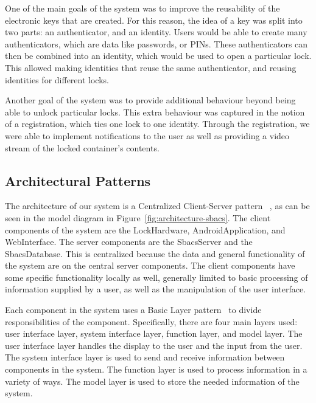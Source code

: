 \documentclass[12pt]{report}
\let\Oldsubsection\subsection
\renewcommand{\subsection}{\FloatBarrier\Oldsubsection}
\begin{document}
One of the main goals of the system was to improve the reusability of the electronic keys that are created. For this
reason, the idea of a key was split into two parts: an authenticator, and an identity. Users would be able to create
many authenticators, which are data like passwords, or PINs. These authenticators can then be combined into an identity, which
would be used to open a particular lock. This allowed making identities that reuse the same authenticator, and reusing
identities for different locks.

Another goal of the system was to provide additional behaviour beyond being able to unlock particular locks.
This extra behaviour was captured in the notion of a registration, which ties one lock to one identity. Through the
registration, we were able to implement notifications to the user as well as providing a video stream of the locked 
container's contents.


\subsection{Architectural Patterns} \label{architectural-patterns}

The architecture of our system is a Centralized Client-Server pattern ~\autocite{CLIENTSERVERARCH}, as can be seen 
in the model diagram in Figure~\ref{fig:architecture-sbacs}. The client components of
the system are the LockHardware, AndroidApplication, and WebInterface. The server components are the SbacsServer and
the SbacsDatabase. This is centralized because the data and general functionality of the system are on the central
server components. The client components have some specific functionality locally as well, generally limited to
basic processing of information supplied by a user, as well as the manipulation of the user interface.

Each component in the system uses a Basic Layer pattern~\autocite{LAYERPATTERNBOOK} to divide responsibilities of the component. Specifically,
there are four main layers used: user interface layer, system interface layer, function layer, and model layer.
The user interface layer handles the display to the user and the input from the user. The system interface layer
is used to send and receive information between components in the system. The function layer is used to process
information in a variety of ways. The model layer is used to store the needed information of the system.
\end{document}
